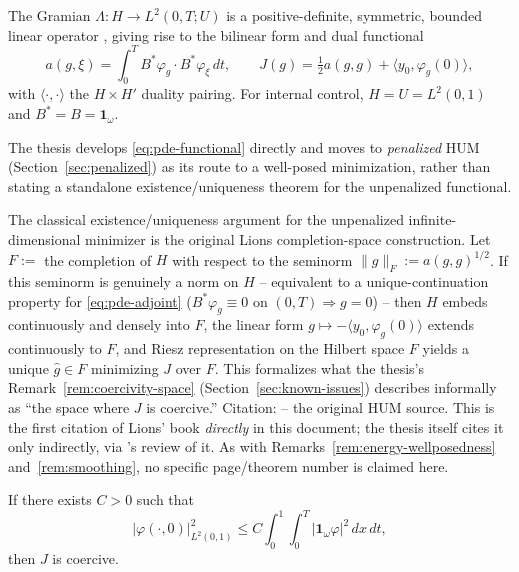 \begin{proposition}
  \label{prop:pde-gramian}
  The Gramian $\Lambda: H \to L^2(0,T;U)$ is a positive-definite, symmetric,
  bounded linear operator \citep{boyer2013penalised}, giving rise to the
  bilinear form and dual functional
  \begin{equation}
    \label{eq:pde-functional}
    a(g,\xi) = \int_0^T B^*\varphi_g \cdot B^*\varphi_\xi\,dt, \qquad
    J(g) = \tfrac12 a(g,g) + \langle y_0, \varphi_g(0)\rangle,
  \end{equation}
  with $\langle\cdot,\cdot\rangle$ the $H\times H'$ duality pairing. For
  internal control, $H = U = L^2(0,1)$ and $B^* = B = \mathbf{1}_\omega$.
\end{proposition}

The thesis develops \eqref{eq:pde-functional} directly and moves to
\emph{penalized} HUM (Section~\ref{sec:penalized}) as its route to a
well-posed minimization, rather than stating a standalone
existence/uniqueness theorem for the unpenalized functional.

\begin{remark}
  \label{rem:hum-existence}
  The classical existence/uniqueness argument for the unpenalized
  infinite-dimensional minimizer is the original Lions completion-space
  construction. Let
  $F := $ the completion of $H$ with respect to the seminorm
  $\|g\|_F := a(g,g)^{1/2}$. If this seminorm is genuinely a norm on $H$ --
  equivalent to a unique-continuation property for \eqref{eq:pde-adjoint}
  ($B^*\varphi_g \equiv 0$ on $(0,T) \Rightarrow g=0$) -- then $H$ embeds
  continuously and densely into $F$, the linear form
  $g \mapsto -\langle y_0,\varphi_g(0)\rangle$ extends continuously to $F$,
  and Riesz representation on the Hilbert space $F$ yields a unique
  $\hat g \in F$ minimizing $J$ over $F$. This formalizes what the thesis's
  Remark~\ref{rem:coercivity-space} (Section~\ref{sec:known-issues}) describes
  informally as ``the space where $J$ is coercive.''
  Citation: \citet{lions1988controlabilite} -- the original HUM source. This
  is the first citation of Lions' book \emph{directly} in this document; the
  thesis itself cites it only indirectly, via \citealp{russell1990j}'s review
  of it. As with Remarks~\ref{rem:energy-wellposedness} and~\ref{rem:smoothing},
  no specific page/theorem number is claimed here.
\end{remark}

\begin{theorem}
  \label{thm:internal-observability}
  If there exists $C>0$ such that
  \begin{equation}
    \label{eq:internal-observability}
    |\varphi(\cdot,0)|^2_{L^2(0,1)} \le
    C \int_0^1\!\int_0^T |\mathbf{1}_\omega\varphi|^2\,dx\,dt,
  \end{equation}
  then $J$ is coercive.
\end{theorem}

